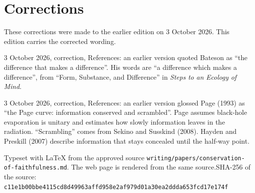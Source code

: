 \documentclass[11pt]{article}
\begin{document}
\section*{Corrections}
These corrections were made to the earlier edition on 3 October 2026. This edition carries the corrected wording.

3 October 2026, correction, References: an earlier version quoted Bateson as ``the difference that makes a difference''. His words are ``a difference which makes a difference'', from ``Form, Substance, and Difference'' in \emph{Steps to an Ecology of Mind}.

3 October 2026, correction, References: an earlier version glossed Page (1993) as ``the Page curve: information conserved and scrambled''. Page assumes black-hole evaporation is unitary and estimates how slowly information leaves in the radiation. ``Scrambling'' comes from Sekino and Susskind (2008). Hayden and Preskill (2007) describe information that stays concealed until the half-way point.

\vfill{\footnotesize Typeset with LaTeX from the approved source \texttt{writing/papers/conservation-of-faithfulness.md}. The web page is rendered from the same source.\newline SHA-256 of the source: \texttt{c11e1b00bbe4115cd8d49963affd958e2af979d01a30ea2ddda653fcd17e174f}\par}
\end{document}
